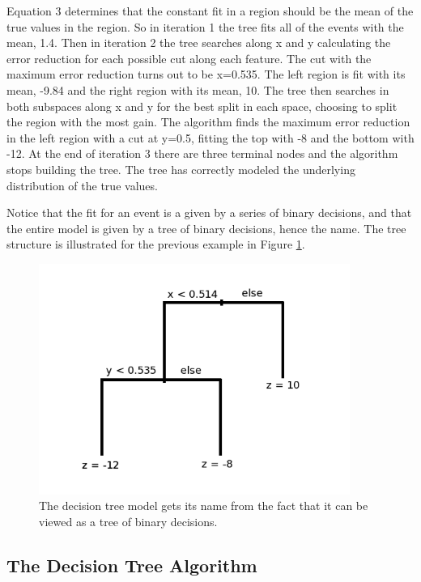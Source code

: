 \documentclass[12pt]{article}
\begin{document}
\newpage

Equation 3 determines that the constant fit in a region should be the mean of the true values in the region. So in iteration 1 the tree fits all of the events with the mean, 1.4. Then in iteration 2 the tree searches along x and y calculating the error reduction for each possible cut along each feature. The cut with the maximum error reduction turns out to be x=0.535. The left region is fit with its mean, -9.84 and the right region with its mean, 10. The tree then searches in both subspaces along x and y for the best split in each space, choosing to split the region with the most gain. The algorithm finds the maximum error reduction in the left region with a cut at y=0.5, fitting the top with -8 and the bottom with -12. At the end of iteration 3 there are three terminal nodes and the algorithm stops building the tree. The tree has correctly modeled the underlying distribution of the true values. 

Notice that the fit for an event is a given by a series of binary decisions, and that the entire model is given by a tree of binary decisions, hence the name. The tree structure is illustrated for the previous example in Figure \ref{fig:dtstruct}.

\begin{figure}[h!]
  \centering
  \includegraphics[width=4in]{imgs/BDT_tree_structure.png}
  \caption
   {The decision tree model gets its name from the fact that it can be viewed as a tree of binary decisions.}
  \label{fig:dtstruct}
\end{figure}

\newpage
\subsection{The Decision Tree Algorithm}
\end{document}
